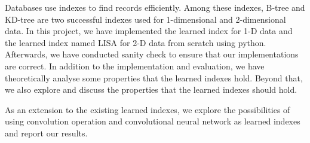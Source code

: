 Databases use indexes to find records efficiently. Among these indexes, B-tree and KD-tree are two successful indexes used for 1-dimensional and 2-dimensional data. In this project, we have implemented the learned index \cite{kraska2018case} for 1-D data and the learned index named LISA \cite{li2020lisa} for 2-D data from scratch using python. Afterwards, we have conducted sanity check to ensure that our implementations are correct. In addition to the implementation and evaluation, we have theoretically analyse some properties that the learned indexes hold. Beyond that, we also explore and discuss the properties that the learned indexes should hold.

As an extension to the existing learned indexes, we explore the possibilities of using convolution operation and convolutional neural network as learned indexes and report our results. 